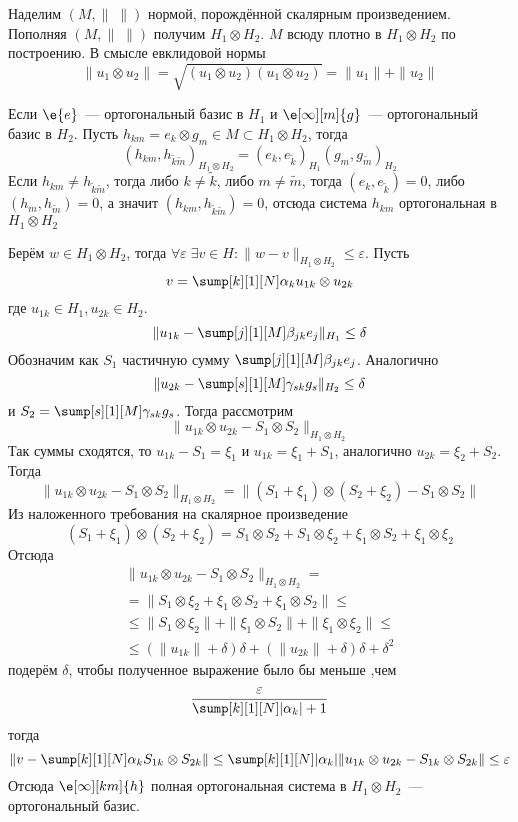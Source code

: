 \documentclass[14pt]{extarticle}
\begin{document}
Наделим $(M, \|\;\|)$ нормой, порождённой скалярным произведением.
Пополняя $(M, \|\;\|)$ получим $H_1 \otimes H_2$.
$M$ всюду плотно в $H_1 \otimes H_2$ по построению.
В смысле евклидовой нормы
$$
\|u_1 \otimes u_2\| = \sqrt{(u_1 \otimes u_2)(u_1 \otimes u_2)} = \|u_1\| + \|u_2\|
$$

Если $\e{e}$~--- ортогональный базис в $H_1$ и $\e[\infty][m]{g}$~--- ортогональный
базис в $H_2$.
Пусть $h_{km} = e_k \otimes g_m \in M \subset H_1 \otimes H_2$, тогда
$$
(h_{km}, h_{\tilde{k}\tilde{m}})_{H_1 \otimes H_2} = (e_k, e_{\tilde{k}})_{H_1}
(g_m, g_{\tilde{m}})_{H_2}
$$
Если $h_{km} \ne h_{\tilde{k}\tilde{m}}$, тогда либо $k \ne \tilde{k}$, либо
$m \ne \tilde{m}$, тогда $(e_k, e_{\tilde{k}}) = 0$, либо $(h_m, h_{\tilde{m}}) = 0$, а значит
$(h_{km},h_{\tilde{k}\tilde{m}}) = 0$, отсюда система $h_{km}$ ортогональная в $H_1
\otimes H_2$

Берём $w \in H_1 \otimes H_2$, тогда $\forall \varepsilon\; \exists v \in H\colon \|w - v\|
_{H_1 \otimes H_2} \le \varepsilon$.
Пусть
$$
v = \sump[k][1][N] \alpha_k u_{1k} \otimes u_{2k}
$$
где $u_{1k} \in H_1, u_{2k} \in H_2$.
$$
\|u_{1k} - \sump[j][1][M]\beta_{jk}e_j\|_{H_1} \le \delta
$$
Обозначим как $S_1$ частичную сумму $\sump[j][1][M]\beta_{jk}e_j$.
Аналогично
$$
\|u_{2k} - \sump[s][1][M]\gamma_{sk}g_s\|_{H_2} \le \delta
$$
и $S_2 = \sump[s][1][M]\gamma_{sk}g_s$.
Тогда рассмотрим
$$
\|u_{1k} \otimes u_{2k} - S_1 \otimes S_2\|_{H_1 \otimes H_2}
$$
Так суммы сходятся, то $u_{1k} - S_1 = \xi_1$ и $u_{1k} = \xi_1 + S_1$, аналогично
$u_{2k} = \xi_2 + S_2$.
Тогда
$$
\|u_{1k} \otimes u_{2k} - S_1 \otimes S_2\|_{H_1 \otimes H_2} = \|(S_1 + \xi_1) \otimes
(S_2 + \xi_2) - S_1 \otimes S_2\|
$$
Из наложенного требования на скалярное произведение
$$
(S_1 + \xi_1) \otimes (S_2 + \xi_2) = S_1 \otimes S_2 +S_1 \otimes \xi_2 + \xi_1 \otimes S_2 +
\xi_1 \otimes \xi_2
$$
Отсюда
\begin{multline*}
\|u_{1k} \otimes u_{2k} - S_1 \otimes S_2\|_{H_1 \otimes H_2} =\\=
\|S_1 \otimes \xi_2 + \xi_1 \otimes S_2 + \xi_1 \otimes S_2\| \le\\\le
\|S_1 \otimes \xi_2\| + \|\xi_1 \otimes S_2\| + \|\xi_1 \otimes \xi_2\| \le\\\le
(\|u_{1k}\| + \delta)\delta + (\|u_{2k}\| + \delta)\delta + \delta^2
\end{multline*}
подерём $\delta$, чтобы полученное выражение было бы меньше ,чем
$$
\dfrac{\varepsilon}{\sump[k][1][N]|\alpha_k| + 1}
$$
тогда
$$
\|v - \sump[k][1][N] \alpha_k S_{1k} \otimes S_{2k}\| \le \sump[k][1][N]|\alpha_k|
\|u_{1k} \otimes u_{2k} - S_{1k} \otimes S_{2k}\| \le \varepsilon
$$
Отсюда $\e[\infty][km]{h}$ полная ортогональная система в $H_1 \otimes 
H_2$~--- ортогональный базис.
\end{document}
